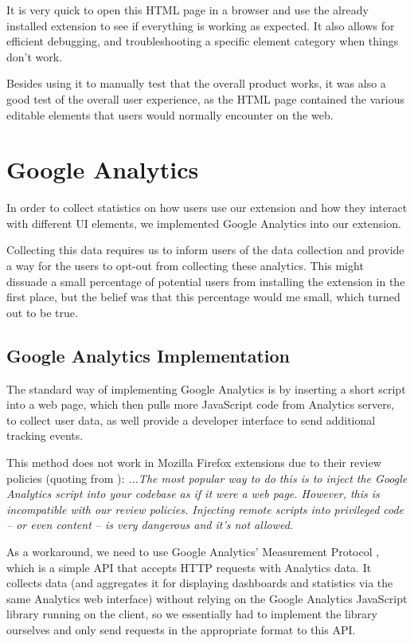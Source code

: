 \documentclass[bsc,frontabs,twoside,singlespacing,parskip,deptreport]{infthesis}
\begin{document}
It is very quick to open this HTML page in a browser and use the already installed extension to see if everything is working as expected. It also allows for efficient debugging, and troubleshooting a specific element category when things don't work.

Besides using it to manually test that the overall product works, it was also a good test of the overall user experience, as the HTML page contained the various editable elements that users would normally encounter on the web.

\section{Google Analytics}
In order to collect statistics on how users use our extension and how they interact with different UI elements, we implemented Google Analytics into our extension.

Collecting this data requires us to inform users of the data collection and provide a way for the users to opt-out from collecting these analytics. This might dissuade a small percentage of potential users from installing the extension in the first place, but the belief was that this percentage would me small, which turned out to be true.

\subsection{Google Analytics Implementation}
The standard way of implementing Google Analytics is by inserting a short script into a web page, which then pulls more JavaScript code from Analytics servers, to collect user data, as well provide a developer interface to send additional tracking events.

This method does not work in Mozilla Firefox extensions due to their review policies (quoting from \cite{A20}): \textit{...The most popular way to do this is to inject the Google Analytics script into your codebase as if it were a web page. However, this is incompatible with our review policies. Injecting remote scripts into privileged code – or even content – is very dangerous and it’s not allowed.}

As a workaround, we need to use Google Analytics' Measurement Protocol \cite{A21}, which is a simple API that accepts HTTP requests with Analytics data. It collects data (and aggregates it for displaying dashboards and statistics via the same Analytics web interface) without relying on the Google Analytics JavaScript library running on the client, so we essentially had to implement the library ourselves and only send requests in the appropriate format to this API.
\end{document}
